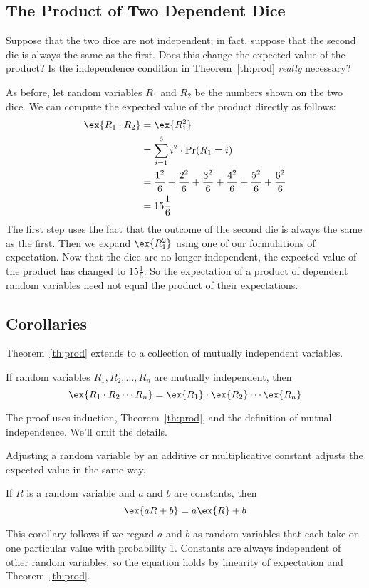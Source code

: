 \documentclass[12pt,twoside]{article}
\begin{document}
\subsection{The Product of Two Dependent Dice}

Suppose that the two dice are not independent; in fact, suppose that
the second die is always the same as the first.  Does this change the
expected value of the product?  Is the independence condition in
Theorem~\ref{th:prod} \textit{really} necessary?

As before, let random variables $R_1$ and $R_2$ be the numbers shown
on the two dice.  We can compute the expected value of the product
directly as follows:
%
\begin{align*}
\ex{R_1 \cdot R_2}
	& = 	\ex{R_1^2} \\
	& = 	\sum_{i=1}^6 i^2 \cdot \Pr(R_1 = i) \\
	& = 	\frac{1^2}{6} + \frac{2^2}{6} + \frac{3^2}{6} + 
		\frac{4^2}{6} + \frac{5^2}{6} + \frac{6^2}{6} \\
	& = 	15 \frac{1}{6}
\end{align*}
%
The first step uses the fact that the outcome of the second die is
always the same as the first.  Then we expand $\ex{R_1^2}$ using one
of our formulations of expectation.  Now that the dice are no longer
independent, the expected value of the product has changed to $15
\frac{1}{6}$.  So the expectation of a product of dependent random
variables need not equal the product of their expectations.

\subsection{Corollaries}

Theorem~\ref{th:prod} extends to a collection of mutually independent
variables.
%
\begin{corollary}
If random variables $R_1, R_2, \ldots, R_n$ are mutually independent,
then
%
\[
\ex{R_1 \cdot R_2 \cdots R_n} = \ex{R_1} \cdot \ex{R_2} \cdots \ex{R_n}
\]
\end{corollary}

The proof uses induction, Theorem~\ref{th:prod}, and the definition of
mutual independence.  We'll omit the details.

%
%

Adjusting a random variable by an additive or multiplicative constant
adjusts the expected value in the same way.
%
\begin{corollary}
If $R$ is a random variable and $a$ and $b$ are constants, then
%
\[
\ex{a R + b} = a \ex{R} + b
\]
\end{corollary}
%
This corollary follows if we regard $a$ and $b$ as random variables
that each take on one particular value with probability 1.  Constants
are always independent of other random variables, so the equation
holds by linearity of expectation and Theorem~\ref{th:prod}.
\end{document}
